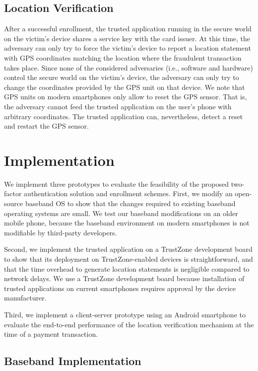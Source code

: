 \subsection{Location Verification}

After a successful enrollment, the trusted application running in the secure
world on the victim's device shares a service key with the card issuer.  At this
time, the adversary can only try to force the victim's device to report a
location statement with GPS coordinates matching the location where the
fraudulent transaction takes place. Since none of the considered adversaries
(i.e., software and hardware) control the secure world on the victim's device,
the adversary can only try to change the coordinates provided by the GPS unit on
that device.  We note that GPS units on modern smartphones only allow to reset
the GPS sensor.  That is, the adversary cannot feed the trusted application on
the user's phone with arbitrary coordinates. The trusted application can,
nevertheless, detect a reset and restart the GPS sensor.

\section{Implementation}
\label{sec:ps_tee_implementation}

We implement three prototypes to evaluate the feasibility of the proposed
two-factor authentication solution and enrollment schemes. First, we modify
an open-source baseband OS to show that the changes required to existing
baseband operating systems are small. We test our baseband modifications on an
older mobile phone, because the baseband environment on modern smartphones is
not modifiable by third-party developers.

Second, we implement the trusted application on a TrustZone development board to
show that its deployment on TrustZone-enabled devices is straightforward, and
that the time overhead to generate location statements is negligible compared to
network delays. We use a TrustZone development board because installation of
trusted applications on current smartphones requires approval by the device
manufacturer.

Third, we implement a client-server prototype using an Android smartphone to
evaluate the end-to-end performance of the location verification mechanism at
the time of a payment transaction.

\subsection{Baseband Implementation}

